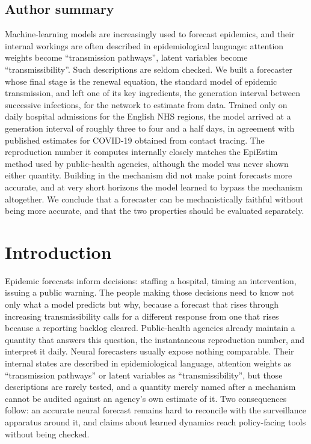 \documentclass[10pt,letterpaper]{article}
\begin{document}
\subsection*{Author summary}
Machine-learning models are increasingly used to forecast epidemics, and their
internal workings are often described in epidemiological language: attention
weights become ``transmission pathways'', latent variables become
``transmissibility''. Such descriptions are seldom checked. We built a
forecaster whose final stage is the renewal equation, the standard model of
epidemic transmission, and left one of its key ingredients, the generation
interval between successive infections, for the network to estimate from data.
Trained only on daily hospital admissions for the English NHS regions, the
model arrived at a generation interval of roughly three to four and a half
days, in agreement with published estimates for COVID-19 obtained from
contact tracing. The reproduction number it computes internally closely
matches the EpiEstim method used by public-health agencies, although the model
was never shown either quantity. Building in the mechanism did not make point
forecasts more accurate, and at very short horizons the model learned to
bypass the mechanism altogether. We conclude that a forecaster can be
mechanistically faithful without being more accurate, and that the two
properties should be evaluated separately.

\section{Introduction}

Epidemic forecasts inform decisions: staffing a hospital, timing an
intervention, issuing a public warning. The people making those decisions need
to know not only what a model predicts but why, because a forecast that rises
through increasing transmissibility calls for a different response from one
that rises because a reporting backlog cleared. Public-health agencies already
maintain a quantity that answers this question, the instantaneous reproduction
number, and interpret it daily. Neural forecasters usually expose nothing
comparable. Their internal states are described in epidemiological language,
attention weights as ``transmission pathways'' or latent variables as
``transmissibility'', but those descriptions are rarely tested, and a quantity
merely named after a mechanism cannot be audited against an agency's own
estimate of it. Two consequences follow: an accurate neural forecast remains
hard to reconcile with the surveillance apparatus around it, and claims about
learned dynamics reach policy-facing tools without being checked.
\end{document}
